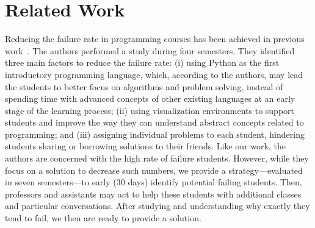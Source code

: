 \section{Related Work}

Reducing the failure rate in programming courses has been achieved in previous work~\cite{}. The authors performed a study during four semesters. They identified three main factors to reduce the failure rate: (i) using Python as the first introductory programming language, which, according to the authors, may lead the students to better focus on algorithms and problem solving, instead of spending time with advanced concepts of other existing languages at an early stage of the learning process; (ii) using visualization environments to support students and improve the way they can understand abstract concepts related to programming; and (iii) assigning individual problems to each student, hindering students sharing or borrowing solutions to their friends. Like our work, the authors are concerned with the high rate of failure students. However, while they focus on a solution to decrease such numbers, we provide a strategy---evaluated in seven semesters---to early (30 days) identify potential failing students. Then, professors and assistants may act to help these students with additional classes and particular conversations. After studying and understanding why exactly they tend to fail, we then are ready to provide a solution.  